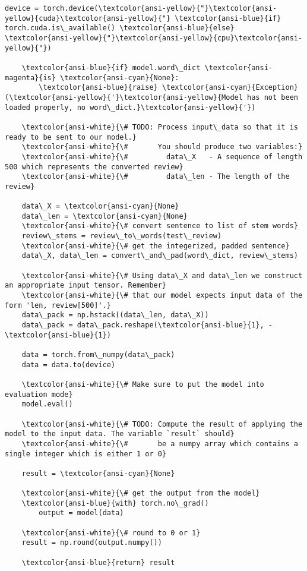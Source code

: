 \documentclass[11pt]{article}
\begin{document}
\begin{Verbatim}[commandchars=\\\{\}]
    device = torch.device(\textcolor{ansi-yellow}{"}\textcolor{ansi-yellow}{cuda}\textcolor{ansi-yellow}{"} \textcolor{ansi-blue}{if} torch.cuda.is\_available() \textcolor{ansi-blue}{else} \textcolor{ansi-yellow}{"}\textcolor{ansi-yellow}{cpu}\textcolor{ansi-yellow}{"})
    
    \textcolor{ansi-blue}{if} model.word\_dict \textcolor{ansi-magenta}{is} \textcolor{ansi-cyan}{None}:
        \textcolor{ansi-blue}{raise} \textcolor{ansi-cyan}{Exception}(\textcolor{ansi-yellow}{'}\textcolor{ansi-yellow}{Model has not been loaded properly, no word\_dict.}\textcolor{ansi-yellow}{'})
    
    \textcolor{ansi-white}{\# TODO: Process input\_data so that it is ready to be sent to our model.}
    \textcolor{ansi-white}{\#       You should produce two variables:}
    \textcolor{ansi-white}{\#         data\_X   - A sequence of length 500 which represents the converted review}
    \textcolor{ansi-white}{\#         data\_len - The length of the review}

    data\_X = \textcolor{ansi-cyan}{None}
    data\_len = \textcolor{ansi-cyan}{None}
    \textcolor{ansi-white}{\# convert sentence to list of stem words}
    review\_stems = review\_to\_words(test\_review)
    \textcolor{ansi-white}{\# get the integerized, padded sentence}
    data\_X, data\_len = convert\_and\_pad(word\_dict, review\_stems)

    \textcolor{ansi-white}{\# Using data\_X and data\_len we construct an appropriate input tensor. Remember}
    \textcolor{ansi-white}{\# that our model expects input data of the form 'len, review[500]'.}
    data\_pack = np.hstack((data\_len, data\_X))
    data\_pack = data\_pack.reshape(\textcolor{ansi-blue}{1}, -\textcolor{ansi-blue}{1})
    
    data = torch.from\_numpy(data\_pack)
    data = data.to(device)

    \textcolor{ansi-white}{\# Make sure to put the model into evaluation mode}
    model.eval()

    \textcolor{ansi-white}{\# TODO: Compute the result of applying the model to the input data. The variable `result` should}
    \textcolor{ansi-white}{\#       be a numpy array which contains a single integer which is either 1 or 0}

    result = \textcolor{ansi-cyan}{None}
    
    \textcolor{ansi-white}{\# get the output from the model}
    \textcolor{ansi-blue}{with} torch.no\_grad()
        output = model(data)
    
    \textcolor{ansi-white}{\# round to 0 or 1}
    result = np.round(output.numpy())
  
    \textcolor{ansi-blue}{return} result

    \end{Verbatim}
\end{document}

